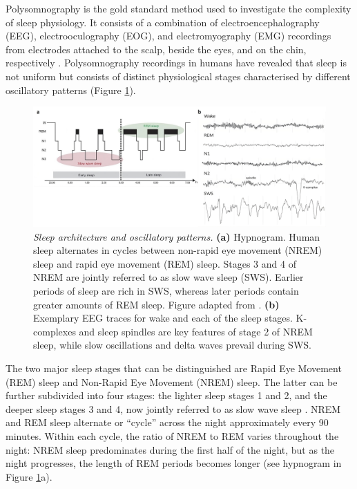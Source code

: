 Polysomnography is the gold standard method used to investigate the complexity of sleep physiology. It consists of a combination of electroencephalography (EEG), electrooculography (EOG), and electromyography (EMG) recordings from electrodes attached to the scalp, beside the eyes, and on the chin, respectively \parencite{iber_aasm_2007}. Polysomnography recordings in humans have revealed that sleep is not uniform but consists of distinct physiological stages characterised by different oscillatory patterns (Figure \ref{fig:SleepPhysio}).

\vspace{1cm}
\begin{figure}[H]
    \centering
    \includegraphics[width=0.9\linewidth]{1_Introduction/IntroImages/Picture1.jpg}
    \caption[\textit{Sleep architecture and oscillatory patterns.}]{\textit{Sleep architecture and oscillatory patterns.} \textbf{(a)} Hypnogram. Human sleep alternates in cycles between non-rapid eye movement (NREM) sleep and rapid eye movement (REM) sleep. Stages 3 and 4 of NREM are jointly referred to as slow wave sleep (SWS). Earlier periods of sleep are rich in SWS, whereas later periods contain greater amounts of REM sleep. Figure adapted from \cite{rasch_about_2013}. \textbf{(b)} Exemplary EEG traces for wake and each of the sleep stages. K-complexes and sleep spindles are key features of stage 2 of NREM sleep, while slow oscillations and delta waves prevail during SWS. \vspace{1cm} \label{fig:SleepPhysio}}
\end{figure}
 \FloatBarrier

The two major sleep stages that can be distinguished are Rapid Eye Movement (REM) sleep and Non-Rapid Eye Movement (NREM) sleep. The latter can be further subdivided into four stages: the lighter sleep stages 1 and 2, and the deeper sleep stages 3 and 4, now jointly referred to as slow wave sleep \parencite[SWS;][]{iber_aasm_2007}. NREM and REM sleep alternate or “cycle” across the night approximately every 90 minutes. Within each cycle, the ratio of NREM to REM varies throughout the night: NREM sleep predominates during the first half of the night, but as the night progresses, the length of REM periods becomes longer (see hypnogram in Figure \ref{fig:SleepPhysio}a). 

